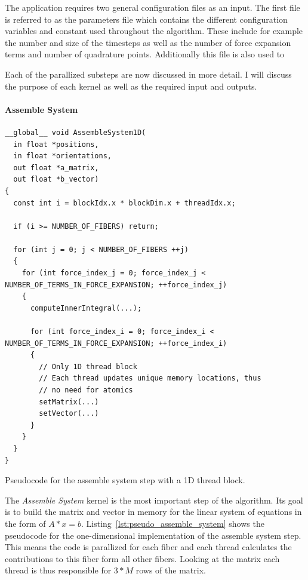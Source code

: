 \documentclass[a4paper,11pt]{kth-mag}
\begin{document}
The application requires two general configuration files as an input. The first file is referred to as the parameters file which contains the different configuration variables and constant used throughout the algorithm. These include for example the number and size of the timesteps as well as the number of force expansion terms and number of quadrature points. Additionally this file is also used to

Each of the parallized substeps are now discussed in more detail. I will discuss the purpose of each kernel as well as the required input and outputs.

\paragraph{Assemble System}

\begin{listing}
  \centering
  \begin{verbatim}
__global__ void AssembleSystem1D(
  in float *positions,
  in float *orientations,
  out float *a_matrix,
  out float *b_vector)
{
  const int i = blockIdx.x * blockDim.x + threadIdx.x;

  if (i >= NUMBER_OF_FIBERS) return;

  for (int j = 0; j < NUMBER_OF_FIBERS ++j)
  {
    for (int force_index_j = 0; force_index_j < NUMBER_OF_TERMS_IN_FORCE_EXPANSION; ++force_index_j)
    {
      computeInnerIntegral(...);

      for (int force_index_i = 0; force_index_i < NUMBER_OF_TERMS_IN_FORCE_EXPANSION; ++force_index_i)
      {
        // Only 1D thread block
        // Each thread updates unique memory locations, thus
        // no need for atomics
        setMatrix(...)
        setVector(...)
      }
    }
  }
}
  \end{verbatim}
  \caption{Pseudocode for the assemble system step with a 1D thread block.}
  \label{lst:pseudo_assemble_system}
\end{listing}

The \emph{Assemble System} kernel is the most important step of the algorithm. Its goal is to build the matrix and vector in memory for the linear system of equations in the form of $A*x = b$. Listing~\ref{lst:pseudo_assemble_system} shows the pseudocode for the one-dimensional implementation of the assemble system step. This means the code is parallized for each fiber and each thread calculates the contributions to this fiber form all other fibers. Looking at the matrix each thread is thus responsible for $3*M$ rows of the matrix.
\end{document}
